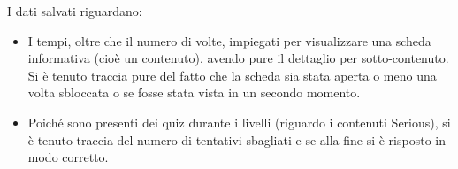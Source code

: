 I dati salvati riguardano:

\begin{itemize}

\item I tempi, oltre che il numero di volte, impiegati per visualizzare una scheda informativa (cioè un contenuto), avendo pure il dettaglio per sotto-contenuto. Si è tenuto traccia pure del fatto che la scheda sia stata aperta o meno una volta sbloccata o se fosse stata vista in un secondo momento.
\item Poiché sono presenti dei quiz durante i livelli (riguardo i contenuti Serious), si è tenuto traccia del numero di tentativi sbagliati e se alla fine si è risposto in modo corretto.

\end{itemize}

\newpage
